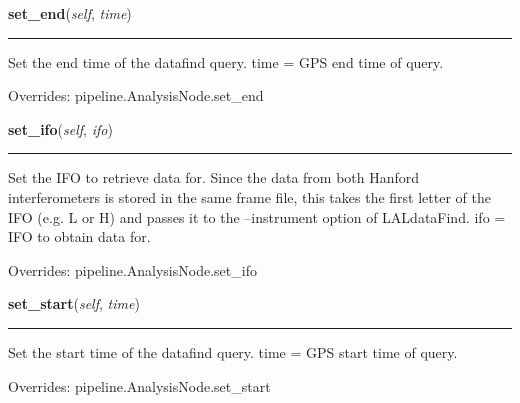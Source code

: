     \label{inspiral:DataFindNode:set_end}
    \vspace{0.5ex}

    \noindent\begin{boxedminipage}{\textwidth}

    \raggedright \textbf{set\_end}(\textit{self}, \textit{time})

    \vspace{-1.5ex}

    \rule{\textwidth}{0.5\fboxrule}
    Set the end time of the datafind query. time = GPS end time of query.

    \vspace{1ex}

      Overrides: pipeline.AnalysisNode.set\_end

    \end{boxedminipage}

    \label{inspiral:DataFindNode:set_ifo}
    \vspace{0.5ex}

    \noindent\begin{boxedminipage}{\textwidth}

    \raggedright \textbf{set\_ifo}(\textit{self}, \textit{ifo})

    \vspace{-1.5ex}

    \rule{\textwidth}{0.5\fboxrule}
    Set the IFO to retrieve data for. Since the data from both Hanford 
    interferometers is stored in the same frame file, this takes the 
    first letter of the IFO (e.g. L or H) and passes it to the 
    --instrument option of LALdataFind. ifo = IFO to obtain data for.

    \vspace{1ex}

      Overrides: pipeline.AnalysisNode.set\_ifo

    \end{boxedminipage}

    \label{inspiral:DataFindNode:set_start}
    \vspace{0.5ex}

    \noindent\begin{boxedminipage}{\textwidth}

    \raggedright \textbf{set\_start}(\textit{self}, \textit{time})

    \vspace{-1.5ex}

    \rule{\textwidth}{0.5\fboxrule}
    Set the start time of the datafind query. time = GPS start time of 
    query.

    \vspace{1ex}

      Overrides: pipeline.AnalysisNode.set\_start

    \end{boxedminipage}

